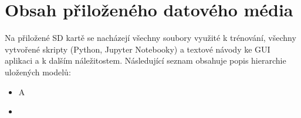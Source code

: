 \chapter{Obsah přiloženého datového média}

Na přiložené SD kartě se nacházejí všechny soubory využité k trénování, všechny vytvořené skripty (Python, Jupyter Notebooky) a textové návody ke GUI aplikaci a k dalším náležitostem. Následující seznam obsahuje popis hierarchie uložených modelů:

\begin{itemize}
    \item  A
    \item 
\end{itemize}
